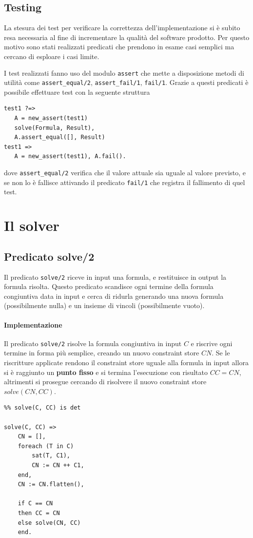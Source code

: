 \documentclass[12pt,a4paper,openright]{book} %
\begin{document}
\subsection{Testing}
\label{sec:lsetpicat_system_tests}

La stesura dei test per verificare la correttezza dell'implementazione si è subito resa necessaria al fine di incrementare la qualità del software prodotto. Per questo motivo sono stati realizzati predicati che prendono in esame casi semplici ma cercano di esploare i casi limite.

I test realizzati fanno uso del modulo \verb|assert| che mette a disposizione metodi di utilità come \verb|assert_equal/2|, \verb|assert_fail/1|, \verb|fail/1|. Grazie a questi predicati è possibile effettuare test con la seguente struttura
\begin{verbatim}
test1 ?=>
   A = new_assert(test1)
   solve(Formula, Result),
   A.assert_equal([], Result)
test1 => 
   A = new_assert(test1), A.fail().
\end{verbatim}
dove \verb|assert_equal/2| verifica che il valore attuale sia uguale al valore previsto, e se non lo è fallisce attivando il predicato \verb|fail/1| che registra il fallimento di quel test.

\section{Il solver}
\label{sec:lsetpicat_solver}

\subsection{Predicato solve/2}
\label{sec:lsetpicat_solver_solve2}

Il predicato \verb|solve/2| riceve in input una formula, e restituisce in output la formula risolta. Questo predicato scandisce ogni termine della formula congiuntiva data in input e cerca di ridurla generando una nuova formula (possibilmente nulla) e un insieme di vincoli (possibilmente vuoto).

\paragraph{Implementazione} Il predicato \verb|solve/2| risolve la formula congiuntiva in input $C$ e riscrive ogni termine in forma più semplice, creando un nuovo constraint store $CN$. Se le riscritture applicate rendono il constraint store uguale alla formula in input allora si è raggiunto un \textbf{punto fisso} e si termina l'esecuzione con risultato $CC = CN$, altrimenti si prosegue cercando di risolvere il nuovo constraint store $solve(CN, CC)$.
\begin{verbatim}
%% solve(C, CC) is det

solve(C, CC) =>
    CN = [],
    foreach (T in C)
        sat(T, C1), 
        CN := CN ++ C1,
    end,
    CN := CN.flatten(),
   
    if C == CN 
    then CC = CN 
    else solve(CN, CC)
    end.
\end{verbatim}
\end{document}
